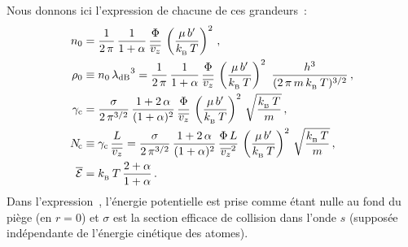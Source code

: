 \noindent Nous donnons ici l'expression de chacune de ces grandeurs~\cite{TTL}: 
\begin{subequations}
\begin{align}
	\njetaxe & = \frac{1}{2\,\pi}\,\frac{1}{1+\alpha}\,\frac{\flux}{\vjet}\,\left( \frac{\mu\,\gradB}{\kb\,T} \right)^2 
	\virguleformule 
	\label{eq:njetaxe}
	\\
	\rhojetaxe & \equiv \njetaxe \, \lambdaDB^3 = \frac{1}{2\,\pi}\,\frac{1}{1+\alpha}\,\frac{\flux}{\vjet}\,\left( \frac{\mu\,\gradB}{\kb\,T} \right)^2
	\,\, \frac{h^3}{(2\,\pi\,m\,\kb\,T)^{3/2}} 
	\virguleformule 
	\label{eq:rhojetaxe}
	\\
	\gammacol & = \frac{\sigma}{2\,\pi^{3/2}} \, \frac{1+2\,\alpha}{(1+\alpha)^2} 
	\, \frac{\flux}{\vjet} \, \left( \frac{\mu\,\gradB}{\kb\,T} \right)^2 
	\, \sqrt{\frac{\kb\,T}{m}} 
	\virguleformule 
	\label{eq:gammacol}
	\\
	\Ncol & \equiv \gammacol \, \frac{\Lguide}{\vjet} =
	\frac{\sigma}{2\,\pi^{3/2}} \, \frac{1+2\,\alpha}{(1+\alpha)^2} 
	\, \frac{\flux\,\Lguide}{\vjet^2} \, \left( \frac{\mu\,\gradB}{\kb\,T} \right)^2 
	\, \sqrt{\frac{\kb\,T}{m}} 
	\virguleformule 
	\label{eq:Ncol}
	\\
 	\Emoy & = \kb\,T\,\frac{2+\alpha}{1+\alpha} 
	\pointformule
	\label{eq:Emoy} 
\end{align}
\end{subequations}
Dans l'expression~, l'énergie potentielle est prise comme étant nulle au fond du piège (en $r=0$) et $\sigma$ %
%
est la section efficace de collision dans l'onde $s$ (supposée indépendante de l'énergie cinétique des atomes).


